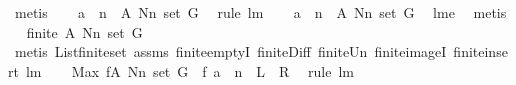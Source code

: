 \begin{isabellebody}
\ metis\ \isamarkupfalse%
\ \isamarkupfalse%
\ {\isachardoublequoteopen}{\isacharquery}a\ {\isacharminus}{\isacharminus}\ n\ {\isasymin}\ {\isacharquery}A{\isacharprime}\ {\isacharparenleft}N{\isacharminus}{\isacharbraceleft}n{\isacharbraceright}{\isacharparenright}\ {\isacharparenleft}set\ G{\isacharparenright}{\isachardoublequoteclose}\ \isamarkupfalse%
\ {\isacharparenleft}rule\ lm{}{}{\isacharparenright}\ \isanewline
{}\isamarkupfalse%
\ \isamarkupfalse%
\ {\isachardoublequoteopen}{\isacharquery}a\ {\isacharminus}{\isacharminus}\ n\ {\isasymin}\ {\isacharquery}A\ {\isacharparenleft}N{\isacharminus}{\isacharbraceleft}n{\isacharbraceright}{\isacharparenright}\ {\isacharparenleft}set\ G{\isacharparenright}{\isachardoublequoteclose}\ \isamarkupfalse%
\ lm{}{}e\ \isamarkupfalse%
\ metis\isanewline
{}\isamarkupfalse%
\ \isamarkupfalse%
\ {\isachardoublequoteopen}finite\ {\isacharparenleft}{\isacharquery}A\ {\isacharparenleft}N{\isacharminus}{\isacharbraceleft}n{\isacharbraceright}{\isacharparenright}\ {\isacharparenleft}set\ G{\isacharparenright}{\isacharparenright}{\isachardoublequoteclose}\ \isanewline
{}\isamarkupfalse%
\ {\isacharparenleft}metis\ List{\isachardot}finite{\isacharunderscore}set\ assms{\isacharparenleft}{}{\isacharparenright}\ finite{\isachardot}emptyI\ finite{\isacharunderscore}Diff\ finite{\isacharunderscore}Un\ finite{\isacharunderscore}imageI\ finite{\isacharunderscore}insert\ lm{}{}{\isacharparenright}\ \isanewline
{}\isamarkupfalse%
\ \isamarkupfalse%
\ {\isachardoublequoteopen}Max\ {\isacharparenleft}{\isacharquery}f{\isacharbackquote}{\isacharparenleft}{\isacharquery}A\ {\isacharparenleft}N{\isacharminus}{\isacharbraceleft}n{\isacharbraceright}{\isacharparenright}\ {\isacharparenleft}set\ G{\isacharparenright}{\isacharparenright}{\isacharparenright}\ {\isachargreater}{\isacharequal}\ {\isacharquery}f\ {\isacharparenleft}{\isacharquery}a\ {\isacharminus}{\isacharminus}\ n{\isacharparenright}{\isachardoublequoteclose}\ {\isacharparenleft}\ {\isachardoublequoteopen}{\isacharquery}L\ {\isachargreater}{\isacharequal}\ {\isacharquery}R{\isachardoublequoteclose}{\isacharparenright}\ \isamarkupfalse%
\ {\isacharparenleft}rule\ lm{}{}{\isacharparenright}\isanewline
{}\isamarkupfalse%
\ \isamarkupfalse%

\end{isabellebody}
